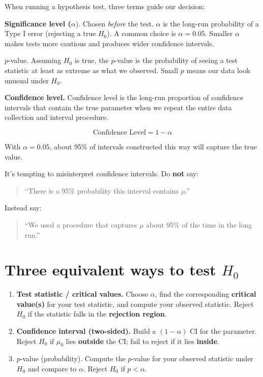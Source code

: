 \documentclass[
  letterpaper,
  DIV=11,
  numbers=noendperiod]{scrreprt}
\begin{document}
When running a hypothesis test, three terms guide our decision:

\textbf{Significance level (}\(\alpha\)). Chosen \emph{before} the test.
\(\alpha\) is the long-run probability of a Type I error (rejecting a
true \(H_0\)). A common choice is \(\alpha = 0.05\). Smaller \(\alpha\)
makes tests more cautious and produces wider confidence intervals.

\(p\)-value. Assuming \(H_0\) is true, the \(p\)-value is the
probability of seeing a test statistic at least as extreme as what we
observed. Small \(p\) means our data look unusual under \(H_0\).

\textbf{Confidence level.} Confidence level is the long-run proportion
of confidence intervals that contain the true parameter when we repeat
the entire data collection and interval procedure.

\[
\text{Confidence Level} = 1 - \alpha
\]

With \(\alpha=0.05\), about 95\% of intervals constructed this way will
capture the true value.

It's tempting to misinterpret confidence intervals. Do \textbf{not} say:

\begin{quote}
``There is a 95\% probability this interval contains \(\mu\).''
\end{quote}

Instead say:

\begin{quote}
``We used a procedure that captures \(\mu\) about 95\% of the time in
the long run.''
\end{quote}

\section{\texorpdfstring{Three equivalent ways to test
\(H_0\)}{Three equivalent ways to test H\_0}}\label{three-equivalent-ways-to-test-h_0}

\begin{enumerate}
\def\labelenumi{\arabic{enumi}.}
\item
  \textbf{Test statistic / critical values.} Choose \(\alpha\), find the
  corresponding \textbf{critical value(s)} for your test statistic, and
  compute your observed statistic. Reject \(H_0\) if the statistic falls
  in the \textbf{rejection region}.
\item
  \textbf{Confidence interval (two-sided).} Build a \((1-\alpha)\) CI
  for the parameter. Reject \(H_0\) if \(\mu_0\) lies \textbf{outside}
  the CI; fail to reject if it lies \textbf{inside}.
\item
  \(p\)-value (probability). Compute the \(p\)-value for your observed
  statistic under \(H_0\) and compare to \(\alpha\). Reject \(H_0\) if
  \(p<\alpha\).
\end{enumerate}
\end{document}

